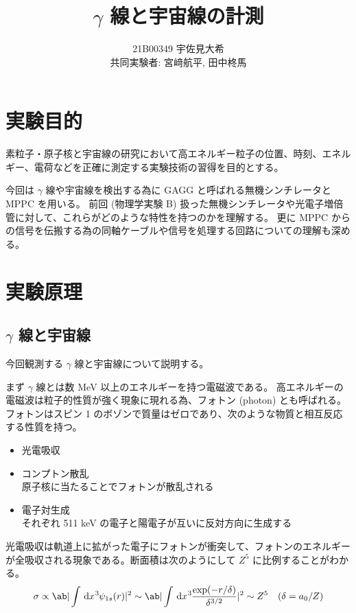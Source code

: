 \documentclass[uplatex,dvipdfmx,a4paper,11pt]{jlreq}
\title{$\gamma$ 線と宇宙線の計測}
\author{21B00349 宇佐見大希 \\ 共同実験者: 宮﨑航平, 田中柊馬}
\numberwithin{equation}{section}
\theoremstyle{definition}
\begin{document}
\maketitle
\clearpage

\section{実験目的}
素粒子・原子核と宇宙線の研究において高エネルギー粒子の位置、時刻、エネルギー、電荷などを正確に測定する実験技術の習得を目的とする。

今回は $\gamma$ 線や宇宙線を検出する為に GAGG と呼ばれる無機シンチレータと MPPC を用いる。
前回 (物理学実験 B) 扱った無機シンチレータや光電子増倍管に対して、これらがどのような特性を持つのかを理解する。
更に MPPC からの信号を伝搬する為の同軸ケーブルや信号を処理する回路についての理解も深める。


\section{実験原理}
\subsection{$\gamma$ 線と宇宙線}
今回観測する $\gamma$ 線と宇宙線について説明する。

まず $\gamma$ 線とは数 \si{MeV} 以上のエネルギーを持つ電磁波である。
高エネルギーの電磁波は粒子的性質が強く現象に現れる為、フォトン (photon) とも呼ばれる。
フォトンはスピン 1 のボゾンで質量はゼロであり、次のような物質と相互反応する性質を持つ。
\begin{itemize}
  \item 光電吸収
  \item コンプトン散乱 \\
        原子核に当たることでフォトンが散乱される
  \item 電子対生成 \\
        それぞれ 511 keV の電子と陽電子が互いに反対方向に生成する
\end{itemize}
光電吸収は軌道上に拡がった電子にフォトンが衝突して、フォトンのエネルギーが全吸収される現象である。断面積は次のようにして $Z^5$ に比例することがわかる。
\begin{align}
  \sigma\propto\ab|\int\dl[3]{x}\psi_{1s}(r)|^2 & \sim \ab|\int\dl[3]{x}\frac{\exp(-r/\delta)}{\delta^{3/2}}|^2 \sim Z^5 & (\delta = a_0/Z)
\end{align}
\end{document}
